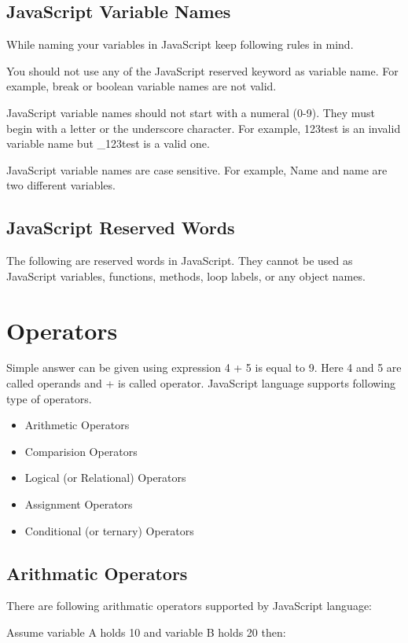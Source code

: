 \documentclass[11pt,a4paper]{article}
\begin{document}
\subsection*{JavaScript Variable Names}
While naming your variables in JavaScript keep following rules in mind.

You should not use any of the JavaScript reserved keyword as variable name. For example, break or boolean variable names are not valid.

JavaScript variable names should not start with a numeral (0-9). They must begin with a letter or the underscore character. 
For example, 123test is an invalid variable name but \_123test is a valid one.

JavaScript variable names are case sensitive. For example, Name and name are two different variables.

\subsection*{JavaScript Reserved Words}
The following are reserved words in JavaScript. They cannot be used as JavaScript variables, functions, methods, loop labels, or any object names.

\section*{Operators}

Simple answer can be given using expression 4 + 5 is equal to 9. Here 4 and 5 are called operands and + is called operator.
JavaScript language supports following type of operators.
\begin{itemize}
\item Arithmetic Operators
\item Comparision Operators
\item Logical (or Relational) Operators
\item Assignment Operators
\item Conditional (or ternary) Operators
\end{itemize}

\subsection*{Arithmatic Operators}

There are following arithmatic operators supported by JavaScript language:

Assume variable A holds 10 and variable B holds 20 then:
\end{document}
